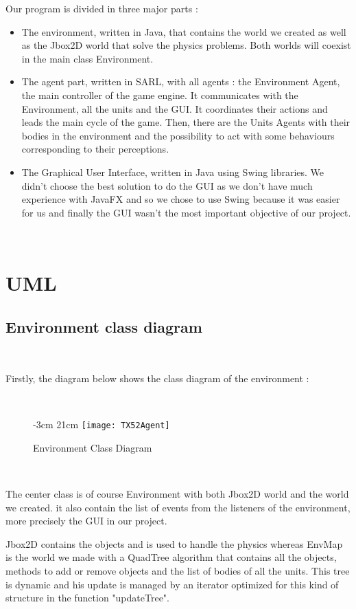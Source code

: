 \documentclass[a4paper,10pt]{book}
\begin{document}
Our program is divided in three major parts :
\begin{itemize}
 \item The environment, written in Java, that contains the world we created as well as the Jbox2D world that solve the physics
 problems. Both worlds will coexist in the main class Environment.
 \item The agent part, written in SARL, with all agents : the Environment Agent, the main controller of the game engine. It
 communicates with the Environment, all the units and the GUI. It coordinates their actions and leads the main cycle of the game.
 Then, there are the Units Agents with their bodies in the environment and the possibility to act with some behaviours corresponding to
 their perceptions.
 \item The Graphical User Interface, written in Java using Swing libraries. We didn't choose the best solution to do the GUI as
 we don't have much experience with JavaFX and so we chose to use Swing because it was easier for us and finally the GUI wasn't the most
 important objective of our project.
\end{itemize}

~
\newpage
\section {UML}
\subsection{Environment class diagram}
~

Firstly, the diagram below shows the class diagram of the environment :

~

\begin{figure}[!ht]
  -3cm 21cm
 \centering
 \texttt{[image: TX52Agent]}
 \caption{Environment Class Diagram}
\end{figure}

~

The center class is of course Environment with both Jbox2D world and the world we created. it also contain the list of events from the listeners of the environment, more precisely the GUI in our project.

Jbox2D contains the objects and is used to handle the physics whereas EnvMap is the world we made with a QuadTree algorithm that contains all the objects, methods to add or remove objects and the list of bodies of all the units. This tree is dynamic and his update is managed by an iterator optimized for this kind of structure in the function "updateTree".
\end{document}
